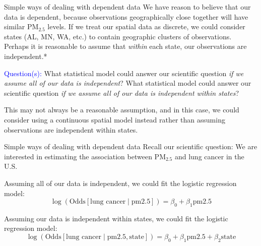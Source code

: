 \documentclass[10pt,t]{beamer}
\begin{document}
\begin{frame}{Simple ways of dealing with dependent data}
We have reason to believe that our data is dependent, because observations geographically close together will have similar $\text{PM}_{2.5}$ levels. If we treat our spatial data as discrete, we could consider states (AL, MN, WA, etc.) to contain geographic clusters of observations. Perhaps it is reasonable to assume that \textit{within} each state, our observations are independent.*

\vspace{0.3cm}

\textcolor{blue}{Question(s):} What statistical model could answer our scientific question \textit{if we assume all of our data is independent}? What statistical model could answer our scientific question \textit{if we assume all of our data is independent within states}?

\vspace{0.3cm}

\vfill

\tiny *This may not always be a reasonable assumption, and in this case, we could consider using a continuous spatial model instead rather than assuming observations are independent within states.
\end{frame}

\begin{frame}{Simple ways of dealing with dependent data}
Recall our scientific question: We are interested in estimating the association between $\text{PM}_{2.5}$ and lung cancer in the U.S.

\vspace{0.3cm}

Assuming all of our data is independent, we could fit the logistic regression model:
$$
\log(\text{Odds}[\text{lung cancer} \mid \text{pm2.5}]) = \beta_0 + \beta_1  \text{pm2.5}
$$

\vspace{0.3cm} Assuming our data is independent within states, we could fit the logistic regression model:
$$
\log(\text{Odds}[\text{lung cancer} \mid \text{pm2.5}, \text{state}]) = \beta_0 + \beta_1  \text{pm2.5} + \beta_2 \text{state}
$$
\end{frame}
\end{document}
